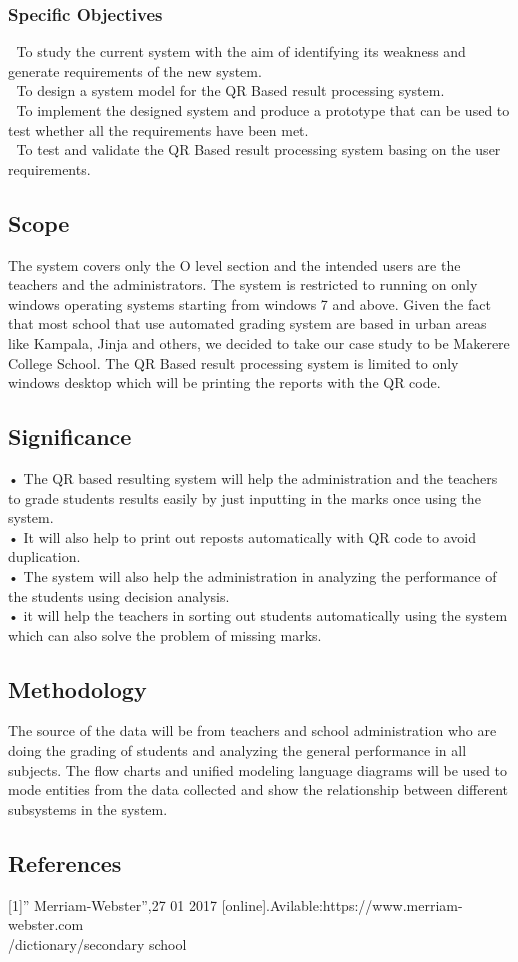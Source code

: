 \documentclass[12pt,letterpaper]{article}
\begin{document}
\subsubsection{Specific Objectives}
	To study the current system with the aim of identifying its weakness and generate requirements of the new system.\\
	To design a system model for the QR Based result processing system.\\ 
	To implement the designed system and produce a prototype that can be used to test whether all the requirements have been met.\\
	To test and validate the QR Based result processing system basing on the user requirements.\\
\subsection{Scope}
The system covers only the O level section and the intended users are the teachers and the administrators. The system is restricted to running on only windows operating systems starting from windows 7 and above.
Given the fact that most school that use automated grading system are based in urban areas like Kampala, Jinja and others, we decided to take our case study to be Makerere College School.
The QR Based result processing system is limited to only windows desktop which will be printing the reports with the QR code.
\subsection{Significance}
•	The QR based resulting system will help the administration and the teachers to grade students results easily by just inputting in the marks once using the system.\\
•	 It will also help to print out reposts automatically with QR code to avoid duplication.\\
•	The system will also help the administration in analyzing the performance of the students using decision analysis.\\
•	 it will help the teachers in sorting out students automatically using the system which can also solve the problem of missing marks.\\
\subsection{ Methodology}

The source of the data will be from teachers and school administration who are doing the grading of students and analyzing the general performance in all subjects.
The flow charts and unified modeling language diagrams will be used to mode entities from the data collected and show the relationship between different subsystems in the system.\\
\subsection{References}
[1]” Merriam-Webster”,27 01 2017
[online].Avilable:https://www.merriam-webster.com\\/dictionary/secondary school
\end{document}
